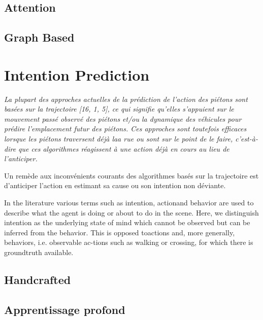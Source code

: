 \subsection{Attention}

\subsection{Graph Based}

\section{Intention Prediction}
\textit{La plupart des approches actuelles de la prédiction de l'action des piétons sont basées sur la trajectoire [16, 1, 5], ce qui signifie qu'elles s'appuient sur le mouvement passé observé des piétons et/ou la dynamique des véhicules pour prédire l'emplacement futur des piétons. Ces approches sont toutefois efficaces lorsque les piétons traversent déjà laa rue ou sont sur le point de le faire, c'est-à-dire que ces algorithmes réagissent à une action déjà en cours au lieu de l'anticiper.}

Un remède aux inconvénients courants des algorithmes basés sur la trajectoire est d'anticiper l'action en estimant sa cause ou son intention non déviante.


In the literature various terms such as intention, actionand behavior are used to describe what the agent is doing or about to do in the scene. Here, we distinguish intention as the underlying state of mind which cannot be observed but can be inferred from the behavior. This is opposed toactions and, more generally, behaviors, i.e. observable ac-tions such as walking or crossing, for which there is groundtruth available.




\subsection{Handcrafted}
\subsection{Apprentissage profond}


